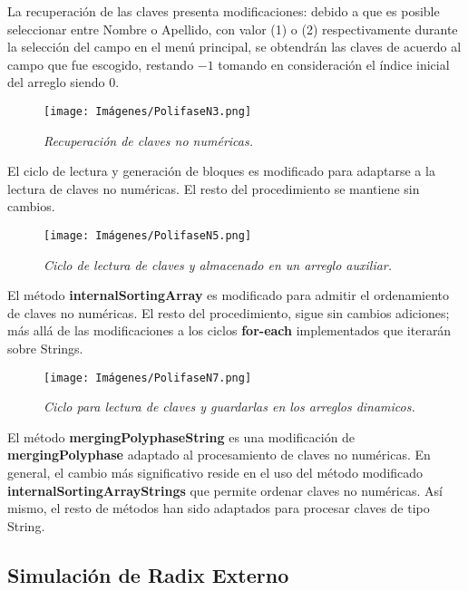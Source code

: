 \documentclass[letterpaper,12pt]{extarticle}
\begin{document}
La recuperación de las claves presenta modificaciones: debido a que es posible seleccionar entre Nombre o Apellido, con valor (1) o (2) respectivamente durante la selección del campo en el menú principal, se obtendrán las claves de acuerdo al campo que fue escogido, restando $-1$ tomando en consideración el índice inicial del arreglo siendo 0.

\begin{figure}[h!]
\centering
\texttt{[image: Imágenes/PolifaseN3.png]}
\caption{\textit{Recuperación de claves no numéricas.}}
\label{fig:PolifaseN3}
\end{figure}

El ciclo de lectura y generación de bloques es modificado para adaptarse a la lectura de claves no numéricas. El resto del procedimiento se mantiene sin cambios.


\begin{figure}[h!]
\centering
\texttt{[image: Imágenes/PolifaseN5.png]}
\caption{\textit{Ciclo de lectura de claves y almacenado en un arreglo auxiliar.}}
\label{fig:PolifaseN4}
\end{figure}

\pagebreak

El método \textbf{internalSortingArray} es modificado para admitir el ordenamiento de claves no numéricas. El resto del procedimiento, sigue sin cambios adiciones; más allá de las modificaciones a los ciclos \textbf{for-each} implementados que iterarán sobre Strings.

\begin{figure}[h!]
\centering
\texttt{[image: Imágenes/PolifaseN7.png]}
\caption{\textit{Ciclo para lectura de claves y guardarlas en los arreglos dinamicos.}}
\label{fig:PolifaseN7}
\end{figure}

\pagebreak

El método \textbf{mergingPolyphaseString} es una modificación de \textbf{mergingPolyphase} adaptado al procesamiento de claves no numéricas. En general, el cambio más significativo reside en el uso del método modificado \textbf{internalSortingArrayStrings} que permite ordenar claves no numéricas. Así mismo, el resto de métodos han sido adaptados para procesar claves de tipo String.

\subsection{Simulación de Radix Externo}
\end{document}
